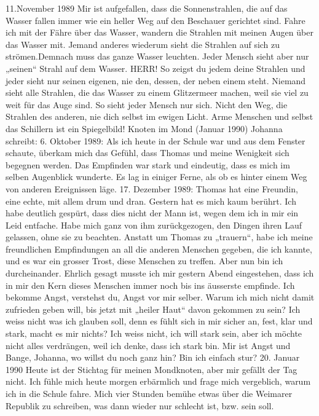 11.November 1989
Mir ist aufgefallen, dass die Sonnenstrahlen, die auf das Wasser fallen immer wie ein heller Weg auf den Beschauer gerichtet sind. Fahre ich mit der Fähre über das Wasser, wandern die Strahlen mit meinen Augen über das Wasser mit. Jemand anderes wiederum sieht die Strahlen auf sich zu strömen.Demnach muss das ganze Wasser leuchten. Jeder Mensch sieht aber nur „seinen“ Strahl auf dem Wasser.
HERR!
So zeigst du jedem deine Strahlen und jeder sieht nur seinen eigenen, nie den, dessen, der neben einem steht. Niemand sieht alle Strahlen, die das Wasser zu einem Glitzermeer machen, weil sie viel zu weit für das Auge sind. So sieht jeder Mensch nur sich. Nicht den Weg, die Strahlen des anderen, nie dich selbst im ewigen Licht. Arme Menschen und selbst das Schillern ist ein Spiegelbild!
Knoten im Mond (Januar 1990)
Johanna schreibt:
6. Oktober 1989:
Als ich heute in der Schule war und aus dem Fenster schaute, überkam mich das Gefühl, dass Thomas und meine Wenigkeit sich begegnen werden. Das Empfinden war stark und eindeutig, dass es mich im selben Augenblick wunderte. Es lag in einiger Ferne, als ob es hinter einem Weg von anderen Ereignissen läge.
17. Dezember 1989:
Thomas hat eine Freundin, eine echte, mit allem drum und dran. Gestern hat es mich kaum berührt. Ich habe deutlich gespürt, dass dies nicht der Mann ist, wegen dem ich in mir ein Leid entfache. Habe mich ganz von ihm zurückgezogen, den Dingen ihren Lauf gelassen, ohne sie zu beachten. Anstatt um Thomas zu „trauern“, habe ich meine freundlichen Empfindungen an all die anderen Menschen gegeben, die ich kannte, und es war ein grosser Trost, diese Menschen zu treffen.
Aber nun bin ich durcheinander. Ehrlich gesagt musste ich mir gestern Abend eingestehen, dass ich in mir den Kern dieses Menschen immer noch bis ins äusserste empfinde. Ich bekomme Angst, verstehst du, Angst vor mir selber. Warum ich mich nicht damit zufrieden geben will, bis jetzt mit „heiler Haut“ davon gekommen zu sein? Ich weiss nicht was ich glauben soll, denn es fühlt sich in mir sicher an, fest, klar und stark, macht es mir nichts?
Ich weiss nicht, ich will stark sein, aber ich möchte nicht alles verdrängen, weil ich denke, dass ich stark bin.
Mir ist Angst und Bange, Johanna, wo willst du noch ganz hin?
Bin ich einfach stur?
20. Januar 1990
Heute ist der Stichtag für meinen Mondknoten, aber mir gefällt der Tag nicht. Ich fühle mich heute morgen erbärmlich und frage mich vergeblich, warum ich in die Schule fahre. Mich vier Stunden bemühe etwas über die Weimarer Republik zu schreiben, was dann wieder nur schlecht ist, bzw. sein soll.
